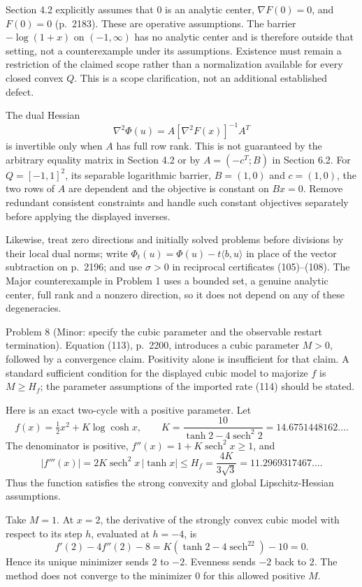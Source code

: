 \documentclass[10pt]{article}
\begin{document}
Section 4.2 explicitly assumes that \(0\) is an analytic center, \(\nabla F(0)=0\), and \(F(0)=0\) (p. 2183). These are operative assumptions. The barrier \(-\log(1+x)\) on \((-1,\infty)\) has no analytic center and is therefore outside that setting, not a counterexample under its assumptions. Existence must remain a restriction of the claimed scope rather than a normalization available for every closed convex \(Q\). This is a scope clarification, not an additional established defect.\par
The dual Hessian \[\nabla^2\Phi(u)=A[\nabla^2F(x)]^{-1}A^T\] is invertible only when \(A\) has full row rank. This is not guaranteed by the arbitrary equality matrix in Section 4.2 or by \(A=(-c^T;B)\) in Section 6.2. For \(Q=[-1,1]^2\), its separable logarithmic barrier, \(B=(1,0)\) and \(c=(1,0)\), the two rows of \(A\) are dependent and the objective is constant on \(Bx=0\). Remove redundant consistent constraints and handle such constant objectives separately before applying the displayed inverses.\par
Likewise, treat zero directions and initially solved problems before divisions by their local dual norms; write \(\Phi_t(u)=\Phi(u)-t\langle b,u\rangle\) in place of the vector subtraction on p. 2196; and use \(\sigma>0\) in reciprocal certificates (105)–(108). The Major counterexample in Problem 1 uses a bounded set, a genuine analytic center, full rank and a nonzero direction, so it does not depend on any of these degeneracies.\par
Problem 8 (Minor: specify the cubic parameter and the observable restart termination).  Equation (113), p. 2200, introduces a cubic parameter \(M>0\), followed by a convergence claim. Positivity alone is insufficient for that claim. A standard sufficient condition for the displayed cubic model to majorize \(f\) is \(M\geq H_f\); the parameter assumptions of the imported rate (114) should be stated.\par
Here is an exact two-cycle with a positive parameter. Let \[f(x)=\tfrac12x^2+K\log\cosh x,\qquad
 K=\frac{10}{\tanh2-4\mathop{\mathrm{sech}}^2 2}=14.6751448162\ldots .\] The denominator is positive, \(f''(x)=1+K\mathop{\mathrm{sech}}^2x\geq1\), and \[|f'''(x)|=2K\mathop{\mathrm{sech}}^2x\,|\tanh x|
 \leq H_f=\frac{4K}{3\sqrt3}=11.2969317467\ldots .\] Thus the function satisfies the strong convexity and global Lipschitz-Hessian assumptions.\par
Take \(M=1\). At \(x=2\), the derivative of the strongly convex cubic model with respect to its step \(h\), evaluated at \(h=-4\), is \[f'(2)-4f''(2)-8
 =K(\tanh2-4\mathop{\mathrm{sech}}^22)-10=0.\] Hence its unique minimizer sends \(2\) to \(-2\). Evenness sends \(-2\) back to \(2\). The method does not converge to the minimizer \(0\) for this allowed positive \(M\).\par
\end{document}
